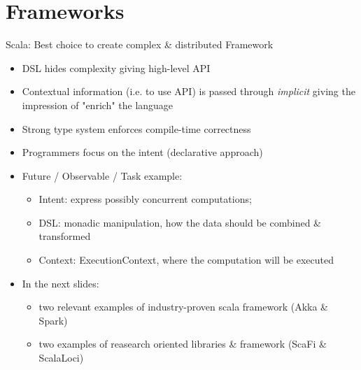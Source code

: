 \documentclass[presentation, 9pt]{beamer}\mode<presentation>{\usetheme{AMSBolognaFC}}
\begin{document}
\section{Frameworks}
\begin{frame}{Scala: Best choice to create complex \& distributed Framework}
	\begin{itemize}
		\item DSL hides complexity giving high-level API
  	\item Contextual information (i.e. to use API) is passed through \emph{implicit} giving the impression of "enrich" the language
   \item Strong type system enforces compile-time correctness
   \item Programmers focus on the intent (declarative approach)
   \item Future / Observable / Task example:
   \begin{itemize}
			\item Intent: express possibly concurrent computations;
   		\item DSL: monadic manipulation, how the data should be combined \& transformed
     \item Context: ExecutionContext, where the computation will be executed 
	 \end{itemize}
	 \item In the next slides:
	 \begin{itemize}
			\item two relevant examples of industry-proven scala framework (Akka \& Spark)
   	\	\item two examples of reasearch oriented libraries \& framework (ScaFi \& ScalaLoci) 
	 \end{itemize}
	\end{itemize}
\end{frame}
\end{document}
